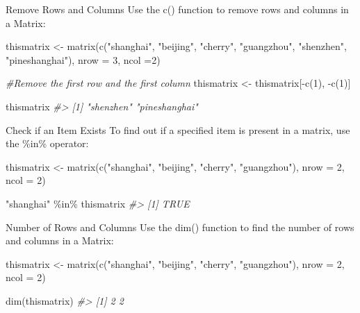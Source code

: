 \documentclass[
]{book}
\newenvironment{Shaded}{\begin{snugshade}}{\end{snugshade}}
\newcommand{\AttributeTok}[1]{\textcolor[rgb]{0.77,0.63,0.00}{#1}}
\newcommand{\CommentTok}[1]{\textcolor[rgb]{0.56,0.35,0.01}{\textit{#1}}}
\newcommand{\DecValTok}[1]{\textcolor[rgb]{0.00,0.00,0.81}{#1}}
\newcommand{\FunctionTok}[1]{\textcolor[rgb]{0.00,0.00,0.00}{#1}}
\newcommand{\NormalTok}[1]{#1}
\newcommand{\OtherTok}[1]{\textcolor[rgb]{0.56,0.35,0.01}{#1}}
\newcommand{\SpecialCharTok}[1]{\textcolor[rgb]{0.00,0.00,0.00}{#1}}
\newcommand{\StringTok}[1]{\textcolor[rgb]{0.31,0.60,0.02}{#1}}
\begin{document}
Remove Rows and Columns
Use the c() function to remove rows and columns in a Matrix:

\begin{Shaded}
\begin{Highlighting}[]
\NormalTok{thismatrix }\OtherTok{\textless{}{-}} \FunctionTok{matrix}\NormalTok{(}\FunctionTok{c}\NormalTok{(}\StringTok{"shanghai"}\NormalTok{, }\StringTok{"beijing"}\NormalTok{, }\StringTok{"cherry"}\NormalTok{, }\StringTok{"guangzhou"}\NormalTok{, }\StringTok{"shenzhen"}\NormalTok{, }\StringTok{"pineshanghai"}\NormalTok{), }\AttributeTok{nrow =} \DecValTok{3}\NormalTok{, }\AttributeTok{ncol =}\DecValTok{2}\NormalTok{)}

\CommentTok{\#Remove the first row and the first column}
\NormalTok{thismatrix }\OtherTok{\textless{}{-}}\NormalTok{ thismatrix[}\SpecialCharTok{{-}}\FunctionTok{c}\NormalTok{(}\DecValTok{1}\NormalTok{), }\SpecialCharTok{{-}}\FunctionTok{c}\NormalTok{(}\DecValTok{1}\NormalTok{)]}

\NormalTok{thismatrix}
\CommentTok{\#\textgreater{} [1] "shenzhen"     "pineshanghai"}
\end{Highlighting}
\end{Shaded}

Check if an Item Exists
To find out if a specified item is present in a matrix, use the \%in\% operator:

\begin{Shaded}
\begin{Highlighting}[]
\NormalTok{thismatrix }\OtherTok{\textless{}{-}} \FunctionTok{matrix}\NormalTok{(}\FunctionTok{c}\NormalTok{(}\StringTok{"shanghai"}\NormalTok{, }\StringTok{"beijing"}\NormalTok{, }\StringTok{"cherry"}\NormalTok{, }\StringTok{"guangzhou"}\NormalTok{), }\AttributeTok{nrow =} \DecValTok{2}\NormalTok{, }\AttributeTok{ncol =} \DecValTok{2}\NormalTok{)}

\StringTok{"shanghai"} \SpecialCharTok{\%in\%}\NormalTok{ thismatrix}
\CommentTok{\#\textgreater{} [1] TRUE}
\end{Highlighting}
\end{Shaded}

Number of Rows and Columns
Use the dim() function to find the number of rows and columns in a Matrix:

\begin{Shaded}
\begin{Highlighting}[]
\NormalTok{thismatrix }\OtherTok{\textless{}{-}} \FunctionTok{matrix}\NormalTok{(}\FunctionTok{c}\NormalTok{(}\StringTok{"shanghai"}\NormalTok{, }\StringTok{"beijing"}\NormalTok{, }\StringTok{"cherry"}\NormalTok{, }\StringTok{"guangzhou"}\NormalTok{), }\AttributeTok{nrow =} \DecValTok{2}\NormalTok{, }\AttributeTok{ncol =} \DecValTok{2}\NormalTok{)}

\FunctionTok{dim}\NormalTok{(thismatrix)}
\CommentTok{\#\textgreater{} [1] 2 2}
\end{Highlighting}
\end{Shaded}
\end{document}
